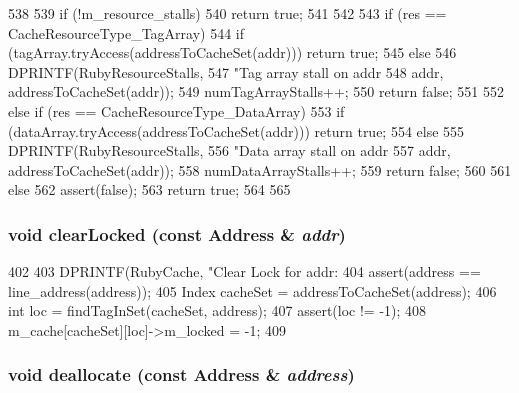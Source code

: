 \begin{DoxyCode}
538 {
539     if (!m_resource_stalls) {
540         return true;
541     }
542 
543     if (res == CacheResourceType_TagArray) {
544         if (tagArray.tryAccess(addressToCacheSet(addr))) return true;
545         else {
546             DPRINTF(RubyResourceStalls,
547                     "Tag array stall on addr %
548                     addr, addressToCacheSet(addr));
549             numTagArrayStalls++;
550             return false;
551         }
552     } else if (res == CacheResourceType_DataArray) {
553         if (dataArray.tryAccess(addressToCacheSet(addr))) return true;
554         else {
555             DPRINTF(RubyResourceStalls,
556                     "Data array stall on addr %
557                     addr, addressToCacheSet(addr));
558             numDataArrayStalls++;
559             return false;
560         }
561     } else {
562         assert(false);
563         return true;
564     }
565 }
\end{DoxyCode}
\hypertarget{classCacheMemory_abd16aaa7623b6ed38e15bde2b210f88a}{
\subsubsection[{clearLocked}]{\setlength{\rightskip}{0pt plus 5cm}void clearLocked (const {\bf Address} \& {\em addr})}}
\label{classCacheMemory_abd16aaa7623b6ed38e15bde2b210f88a}



\begin{DoxyCode}
402 {
403     DPRINTF(RubyCache, "Clear Lock for addr: %
404     assert(address == line_address(address));
405     Index cacheSet = addressToCacheSet(address);
406     int loc = findTagInSet(cacheSet, address);
407     assert(loc != -1);
408     m_cache[cacheSet][loc]->m_locked = -1;
409 }
\end{DoxyCode}
\hypertarget{classCacheMemory_ad1a3e4943cc214363839148c7d94d6a4}{
\subsubsection[{deallocate}]{\setlength{\rightskip}{0pt plus 5cm}void deallocate (const {\bf Address} \& {\em address})}}
\label{classCacheMemory_ad1a3e4943cc214363839148c7d94d6a4}



